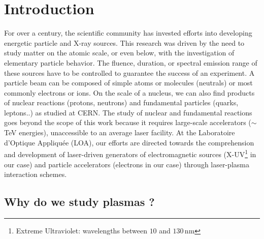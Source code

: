 \chapter{Introduction}
\thispagestyle{empty}

For over a century, the scientific community has invested efforts into developing energetic particle and X-ray sources. This research was driven by the need to study matter on the atomic scale, or even below, with the investigation of elementary particle behavior. The fluence, duration, or spectral emission range of these sources have to be controlled to guarantee the success of an experiment. A particle beam can be composed of simple atoms or molecules (neutrals) or most commonly electrons or ions. On the scale of a nucleus, we can also find products of nuclear reactions (protons, neutrons) and fundamental particles (quarks, leptons..) as studied at CERN. The study of nuclear and fundamental reactions goes beyond the scope of this work because it requires large-scale accelerators ($\sim$TeV energies), unaccessible to an average laser facility. At the Laboratoire d'Optique Appliquée (LOA), our efforts are directed towards the comprehension and development of laser-driven generators of electromagnetic sources (X-UV\footnote{Extreme Ultraviolet: wavelengths between $10$ and $130\,\mathrm{nm}$} in our case) and  particle accelerators (electrons in our case) through laser-plasma interaction schemes. \\


\section{Why do we study plasmas ?}

